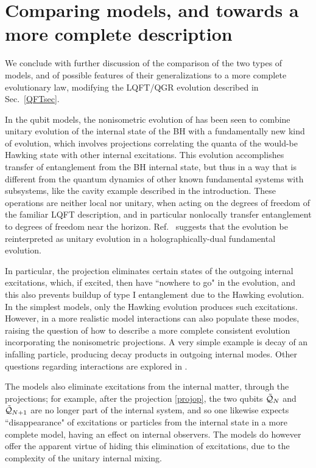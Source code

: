 \documentclass[11pt]{article}
\numberwithin{equation}{section}
\newcommand{\calq}{{\cal Q}}
\begin{document}
\section{Comparing models, and towards a more complete description}

We conclude with further discussion of the comparison of the two types of models, and  of possible features of their generalizations to a more complete evolutionary law, modifying the LQFT/QGR evolution described in Sec.~\ref{QFTsec}.  

In the qubit models, the nonisometric evolution of \cite{AEHPV} has been seen to combine unitary evolution of the internal state of the BH with a fundamentally new kind of evolution, which involves projections correlating the quanta of the would-be Hawking state with other internal excitations.  This evolution accomplishes transfer of entanglement from the BH internal state, but thus in a way that is different from the quantum dynamics of other known fundamental systems with subsystems, like the cavity example described in the introduction. 
These operations are neither local nor unitary, when acting on the degrees of freedom  of the familiar LQFT description, and in particular nonlocally transfer entanglement to degrees of freedom near the horizon.  
Ref.~\cite{AEHPV} suggests that the evolution be reinterpreted as unitary evolution in a holographically-dual fundamental evolution.   

In particular, the projection eliminates certain states of the outgoing internal excitations, which, if excited, then have ``nowhere to go" in the evolution, and this also prevents buildup of type I entanglement due to the Hawking evolution.  In the simplest models, only the Hawking evolution produces such excitations.  However, in a more realistic model interactions can also populate these modes, raising the question of how to describe a more complete consistent evolution incorporating the nonisometric projections.  A very simple example\cite{SE2d} is decay of an infalling particle, producing decay products in outgoing internal modes.  Other questions regarding interactions are explored in \cite{KiPr}.

The models also eliminate excitations from the internal matter, through the projections; for example, after the projection \eqref{projop}, the two qubits $\tilde \calq_N$ and $\tilde \calq_{N+1}$ 
are no longer part of the internal system, and so one likewise expects ``disappearance" of excitations or particles from the internal state in a more complete model, having an effect on internal observers.  The models do however offer the apparent virtue of hiding this elimination of excitations, due to the complexity of the unitary internal mixing\cite{AEHPV}.
\end{document}
